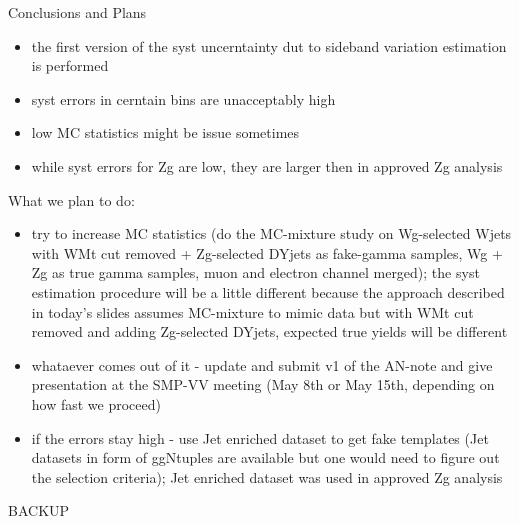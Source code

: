 \documentclass{beamer}
\begin{document}
\begin{frame}{Conclusions and Plans}
  \scriptsize 
  \begin{itemize}
    \item the first version of the syst uncerntainty dut to sideband variation estimation is performed
    \item syst errors in cerntain bins are unacceptably high
    \item low MC statistics might be issue sometimes
    \item while syst errors for Zg are low, they are larger then in approved Zg analysis
  \end{itemize}
  What we plan to do:
  \begin{itemize}
    \item try to increase MC statistics (do the MC-mixture study on Wg-selected Wjets with WMt cut removed + Zg-selected DYjets as fake-gamma samples, Wg + Zg as true gamma samples, muon and electron channel merged); the syst estimation procedure will be a little different because the approach described in today's slides assumes MC-mixture to mimic data but with WMt cut removed and adding Zg-selected DYjets, expected true yields will be different
    \item whataever comes out of it - update and submit v1 of the AN-note and give presentation at the SMP-VV meeting (May 8th or May 15th, depending on how fast we proceed)
    \item if the errors stay high - use Jet enriched dataset to get fake templates (Jet datasets in form of ggNtuples are available but one would need to figure out the selection criteria); Jet enriched dataset was used in approved Zg analysis
  \end{itemize}
\end{frame}

\begin{frame}{BACKUP}

\end{frame}
\end{document}

